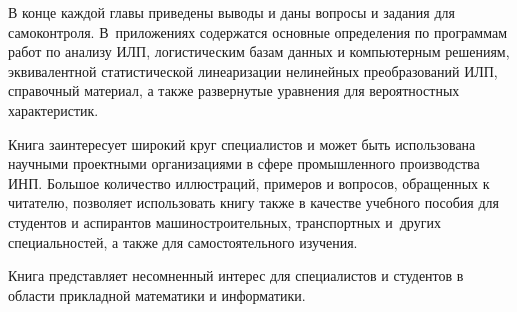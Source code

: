 \begin{multicols}{2}
{{      В конце каждой главы приведены выводы и даны вопросы и задания для 
самоконтроля. В~приложениях содержатся основные определения по программам работ по 
анализу ИЛП, логистическим базам данных и компьютерным решениям, эквивалентной статистической 
линеаризации нелинейных преобразований ИЛП, справочный материал, а также развернутые 
уравнения для вероятностных характеристик.


      \def\leftkol{РЕЦЕНЗИИ}

\def\rightkol{РЕЦЕНЗИИ} 

      
      Книга заинтересует широкий круг специалистов и может быть использована научными 
проектными организациями в сфере промышленного производства ИНП. Большое количество 
иллюстраций, примеров и вопросов, обращенных к читателю, позволяет использовать книгу 
также в качестве учебного пособия для студентов и аспирантов машиностроительных, 
транспортных и~других специальностей, а также для самостоятельного изучения. 
{%

}

Книга 
представляет несомненный интерес для специалистов и студентов в области прикладной 
математики и информатики.
    

}

}
\end{multicols}

